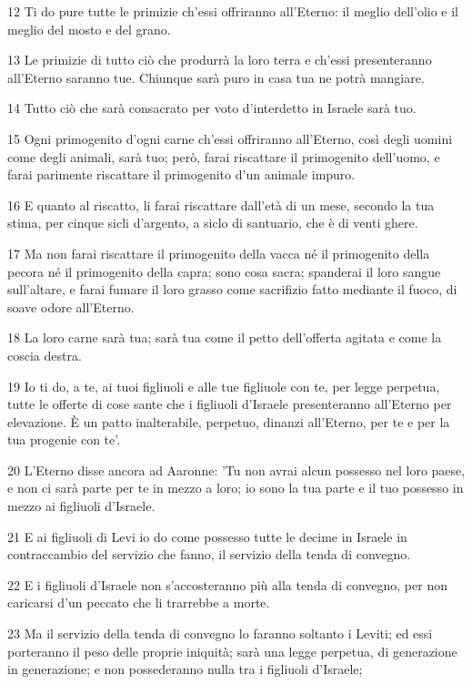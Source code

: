 \par 12 Ti do pure tutte le primizie ch'essi offriranno all'Eterno: il meglio dell'olio e il meglio del mosto e del grano.
\par 13 Le primizie di tutto ciò che produrrà la loro terra e ch'essi presenteranno all'Eterno saranno tue. Chiunque sarà puro in casa tua ne potrà mangiare.
\par 14 Tutto ciò che sarà consacrato per voto d'interdetto in Israele sarà tuo.
\par 15 Ogni primogenito d'ogni carne ch'essi offriranno all'Eterno, così degli uomini come degli animali, sarà tuo; però, farai riscattare il primogenito dell'uomo, e farai parimente riscattare il primogenito d'un animale impuro.
\par 16 E quanto al riscatto, li farai riscattare dall'età di un mese, secondo la tua stima, per cinque sicli d'argento, a siclo di santuario, che è di venti ghere.
\par 17 Ma non farai riscattare il primogenito della vacca né il primogenito della pecora né il primogenito della capra; sono cosa sacra; spanderai il loro sangue sull'altare, e farai fumare il loro grasso come sacrifizio fatto mediante il fuoco, di soave odore all'Eterno.
\par 18 La loro carne sarà tua; sarà tua come il petto dell'offerta agitata e come la coscia destra.
\par 19 Io ti do, a te, ai tuoi figliuoli e alle tue figliuole con te, per legge perpetua, tutte le offerte di cose sante che i figliuoli d'Israele presenteranno all'Eterno per elevazione. È un patto inalterabile, perpetuo, dinanzi all'Eterno, per te e per la tua progenie con te'.
\par 20 L'Eterno disse ancora ad Aaronne: 'Tu non avrai alcun possesso nel loro paese, e non ci sarà parte per te in mezzo a loro; io sono la tua parte e il tuo possesso in mezzo ai figliuoli d'Israele.
\par 21 E ai figliuoli di Levi io do come possesso tutte le decime in Israele in contraccambio del servizio che fanno, il servizio della tenda di convegno.
\par 22 E i figliuoli d'Israele non s'accosteranno più alla tenda di convegno, per non caricarsi d'un peccato che li trarrebbe a morte.
\par 23 Ma il servizio della tenda di convegno lo faranno soltanto i Leviti; ed essi porteranno il peso delle proprie iniquità; sarà una legge perpetua, di generazione in generazione; e non possederanno nulla tra i figliuoli d'Israele;
